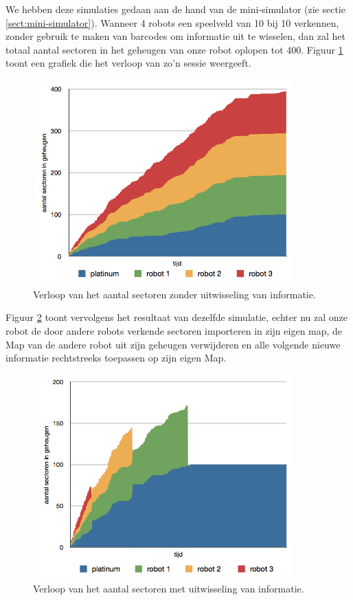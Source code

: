 \documentclass[12pt,a4paper]{report}
\begin{document}
We hebben deze simulaties gedaan aan de hand van de mini-simulator (zie sectie \ref{sect:mini-simulator}). Wanneer 4 robots een speelveld van 10 bij 10 verkennen, zonder gebruik te maken van barcodes om informatie uit te wisselen, dan zal het totaal aantal sectoren in het geheugen van onze robot oplopen tot 400. Figuur \ref{chart:sectors-no-merge} toont een grafiek die het verloop van zo'n sessie weergeeft.

\begin{figure}[htbp]
  \centering
  \includegraphics[width=100mm]{resources/sectors-no-merge.png}
  \caption{Verloop van het aantal sectoren zonder uitwisseling van informatie.}
  \label{chart:sectors-no-merge}
\end{figure}

Figuur \ref{chart:sectors-with-merge} toont vervolgens het resultaat van dezelfde simulatie, echter nu zal onze robot de door andere robots verkende sectoren importeren in zijn eigen map, de Map van de andere robot uit zijn geheugen verwijderen en alle volgende nieuwe informatie rechtstreeks toepassen op zijn eigen Map.

\begin{figure}[htbp]
  \centering
  \includegraphics[width=100mm]{resources/sectors-with-merge.png}
  \caption{Verloop van het aantal sectoren met uitwisseling van informatie.}
  \label{chart:sectors-with-merge}
\end{figure}
\end{document}
